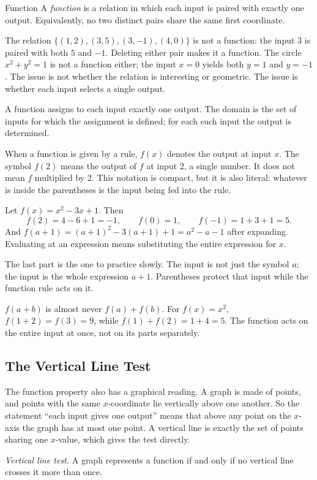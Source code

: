 \documentclass[12pt]{book}
\begin{document}
\begin{definition}{Function}
A \emph{function} is a relation in which each input is paired with exactly one
output. Equivalently, no two distinct pairs share the same first coordinate.
\end{definition}

The relation $\{(1,2),(3,5),(3,-1),(4,0)\}$ is not a function: the input $3$ is
paired with both $5$ and $-1$. Deleting either pair makes it a function. The circle
$x^2+y^2=1$ is not a function either; the input $x=0$ yields both $y=1$ and $y=-1$.
The issue is not whether the relation is interesting or geometric. The issue is
whether each input selects a single output.
\begin{keyidea}
A function assigns to each input exactly one output. The domain is the set of inputs
for which the assignment is defined; for each such input the output is determined.
\end{keyidea}

When a function is given by a rule, $f(x)$ denotes the output at input $x$. The
symbol $f(2)$ means the output of $f$ at input $2$, a single number. It does not mean
$f$ multiplied by $2$. This notation is compact, but it is also literal: whatever is
inside the parentheses is the input being fed into the rule.
\begin{example}
Let $f(x)=x^2-3x+1$. Then
\[
f(2)=4-6+1=-1,\qquad f(0)=1,\qquad f(-1)=1+3+1=5.
\]
And $f(a+1)=(a+1)^2-3(a+1)+1=a^2-a-1$ after expanding. Evaluating at an expression
means substituting the entire expression for $x$.
\end{example}

The last part is the one to practice slowly. The input is not just the symbol $a$;
the input is the whole expression $a+1$. Parentheses protect that input while the
function rule acts on it.

\begin{pitfall}
$f(a+b)$ is almost never $f(a)+f(b)$. For $f(x)=x^2$, $f(1+2)=f(3)=9$, while
$f(1)+f(2)=1+4=5$. The function acts on the entire input at once, not on its parts
separately.
\end{pitfall}

\subsection{The Vertical Line Test}

The function property also has a graphical reading. A graph is made of points, and
points with the same $x$-coordinate lie vertically above one another. So the statement
``each input gives one output'' means that above any point on the $x$-axis the graph
has at most one point. A vertical line is exactly the set of points sharing one
$x$-value, which gives the test directly.
\begin{keyidea}
\emph{Vertical line test.} A graph represents a function if and only if no vertical
line crosses it more than once.
\end{keyidea}
\end{document}
